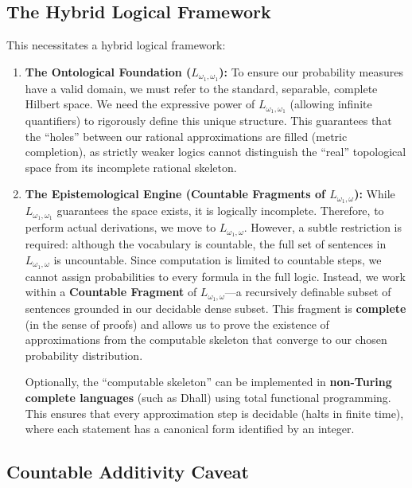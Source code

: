 \documentclass{stex}
\begin{document}
\subsection{The Hybrid Logical Framework}

This necessitates a hybrid logical framework:

\begin{enumerate}
    \item \textbf{The Ontological Foundation ($L_{\omega_1, \omega_1}$):} To ensure our probability measures have a valid domain, we must refer to the standard, separable, complete Hilbert space. We need the expressive power of $L_{\omega_1, \omega_1}$ (allowing infinite quantifiers) to rigorously define this unique structure. This guarantees that the ``holes'' between our rational approximations are filled (metric completion), as strictly weaker logics cannot distinguish the ``real'' topological space from its incomplete rational skeleton.
    
    \item \textbf{The Epistemological Engine (Countable Fragments of $L_{\omega_1, \omega}$):} While $L_{\omega_1, \omega_1}$ guarantees the space exists, it is logically incomplete. Therefore, to perform actual derivations, we move to $L_{\omega_1, \omega}$. However, a subtle restriction is required: although the vocabulary is countable, the full set of sentences in $L_{\omega_1, \omega}$ is uncountable. Since computation is limited to countable steps, we cannot assign probabilities to every formula in the full logic. Instead, we work within a \textbf{Countable Fragment} of $L_{\omega_1, \omega}$---a recursively definable subset of sentences grounded in our decidable dense subset. This fragment is \textbf{complete} (in the sense of proofs) and allows us to prove the existence of approximations from the computable skeleton that converge to our chosen probability distribution.
    
    Optionally, the ``computable skeleton'' can be implemented in \textbf{non-Turing complete languages} (such as Dhall) using total functional programming. This ensures that every approximation step is decidable (halts in finite time), where each statement has a canonical form identified by an integer.
\end{enumerate}

\subsection{Countable Additivity Caveat}
\end{document}
